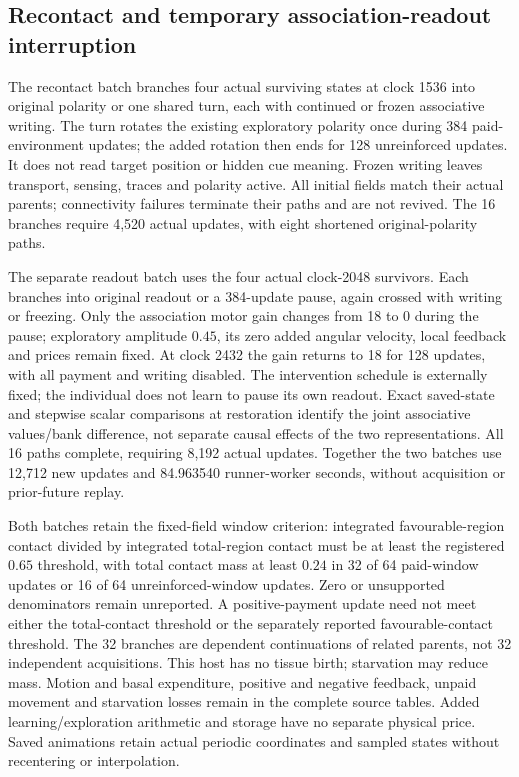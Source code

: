 \subsection*{Recontact and temporary association-readout interruption}

The recontact batch branches four actual surviving states at clock 1536 into original polarity or one shared turn, each with continued or frozen associative writing. The turn rotates the existing exploratory polarity once during 384 paid-environment updates; the added rotation then ends for 128 unreinforced updates. It does not read target position or hidden cue meaning. Frozen writing leaves transport, sensing, traces and polarity active. All initial fields match their actual parents; connectivity failures terminate their paths and are not revived. The 16 branches require 4,520 actual updates, with eight shortened original-polarity paths.

The separate readout batch uses the four actual clock-2048 survivors. Each branches into original readout or a 384-update pause, again crossed with writing or freezing. Only the association motor gain changes from 18 to 0 during the pause; exploratory amplitude $0.45$, its zero added angular velocity, local feedback and prices remain fixed. At clock 2432 the gain returns to 18 for 128 updates, with all payment and writing disabled. The intervention schedule is externally fixed; the individual does not learn to pause its own readout. Exact saved-state and stepwise scalar comparisons at restoration identify the joint associative values/bank difference, not separate causal effects of the two representations. All 16 paths complete, requiring 8,192 actual updates. Together the two batches use 12,712 new updates and 84.963540 runner-worker seconds, without acquisition or prior-future replay.

Both batches retain the fixed-field window criterion: integrated favourable-region contact divided by integrated total-region contact must be at least the registered $0.65$ threshold, with total contact mass at least $0.24$ in 32 of 64 paid-window updates or 16 of 64 unreinforced-window updates. Zero or unsupported denominators remain unreported. A positive-payment update need not meet either the total-contact threshold or the separately reported favourable-contact threshold. The 32 branches are dependent continuations of related parents, not 32 independent acquisitions. This host has no tissue birth; starvation may reduce mass. Motion and basal expenditure, positive and negative feedback, unpaid movement and starvation losses remain in the complete source tables. Added learning/exploration arithmetic and storage have no separate physical price. Saved animations retain actual periodic coordinates and sampled states without recentering or interpolation.

